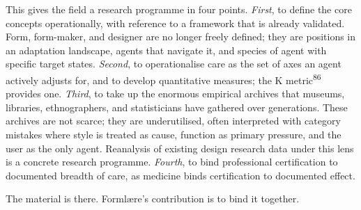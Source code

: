 \begin{widebody}
{This gives the field a research programme in four points. \textit{First}, to define the core concepts operationally, with reference to a framework that is already validated. Form, form-maker, and designer are no longer freely defined; they are positions in an adaptation landscape, agents that navigate it, and species of agent with specific target states. \textit{Second}, to operationalise care as the set of axes an agent actively adjusts for, and to develop quantitative measures; the K metric\textsuperscript{86} provides one. \textit{Third}, to take up the enormous empirical archives that museums, libraries, ethnographers, and statisticians have gathered over generations. These archives are not scarce; they are underutilised, often interpreted with category mistakes where style is treated as cause, function as primary pressure, and the user as the only agent. Reanalysis of existing design research data under this lens is a concrete research programme. \textit{Fourth}, to bind professional certification to documented breadth of care, as medicine binds certification to documented effect.

The material is there. Formlære's contribution is to bind it together.

}
\end{widebody}
